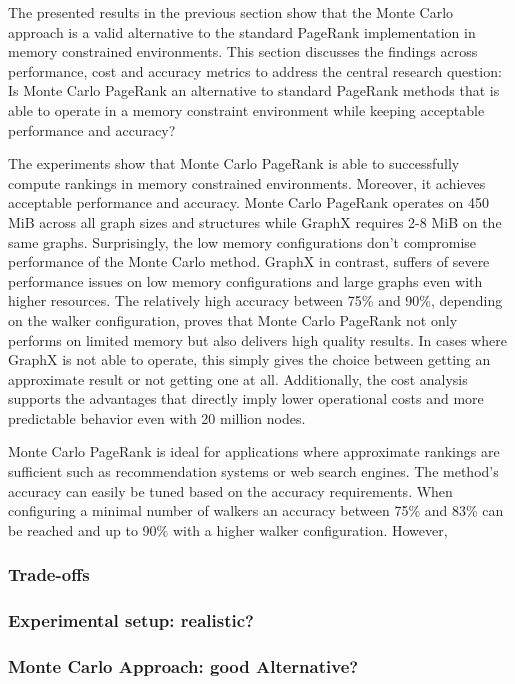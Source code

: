 The presented results in the previous section show that the Monte Carlo approach is a valid alternative to the standard PageRank implementation in memory constrained environments. This section discusses the findings across performance, cost and accuracy metrics to address the central research question: Is Monte Carlo PageRank an alternative to standard PageRank methods that is able to operate in a memory constraint environment while keeping acceptable performance and accuracy?\par

The experiments show that Monte Carlo PageRank is able to successfully compute rankings in memory constrained environments. Moreover, it achieves acceptable performance and accuracy. Monte Carlo PageRank operates on 450 MiB across all graph sizes and structures while GraphX requires 2-8 MiB on the same graphs. Surprisingly, the low memory configurations don't compromise performance of the Monte Carlo method. GraphX in contrast, suffers of severe performance issues on low memory configurations and large graphs even with higher resources. The relatively high accuracy between 75\% and 90\%, depending on the walker configuration, proves that Monte Carlo PageRank not only performs on limited memory but also delivers high quality results. In cases where GraphX is not able to operate, this simply gives the choice between getting an approximate result or not getting one at all. Additionally, the cost analysis supports the advantages that directly imply lower operational costs and more predictable behavior even with 20 million nodes. \par

Monte Carlo PageRank is ideal for applications where approximate rankings are sufficient such as recommendation systems or web search engines. The method's accuracy can easily be tuned based on the accuracy requirements. When configuring a minimal number of walkers an accuracy between 75\% and 83\% can be reached and up to 90\% with a higher walker configuration. However,   



\subsubsection{Trade-offs}
\subsubsection{Experimental setup: realistic?}
\subsubsection{Monte Carlo Approach: good Alternative?}
